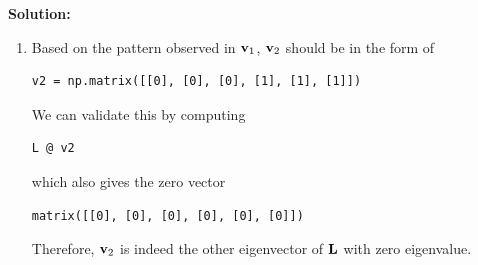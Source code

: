 \documentclass{article}
\newenvironment{solution}
{
\begin{oframed}
\noindent 
\smallskip \textbf{Solution:}\smallskip
}
{
\end{oframed}\par
}
\begin{document}
\begin{solution}
\begin{enumerate}
    \item[5.] Based on the pattern observed in ${\bf v}_{1}$, ${\bf v}_{2}$ should be in the form of
\begin{center}\begin{verbatim}
v2 = np.matrix([[0], [0], [0], [1], [1], [1]])
\end{verbatim}\end{center}
We can validate this by computing
\begin{center}\begin{verbatim}
L @ v2
\end{verbatim}\end{center}
which also gives the zero vector
\begin{center}\begin{verbatim}
matrix([[0], [0], [0], [0], [0], [0]])
\end{verbatim}\end{center}
Therefore, ${\bf v}_{2}$ is indeed the other eigenvector of ${\bf L}$ with zero eigenvalue.
\end{enumerate}
\end{solution}
\end{document}
